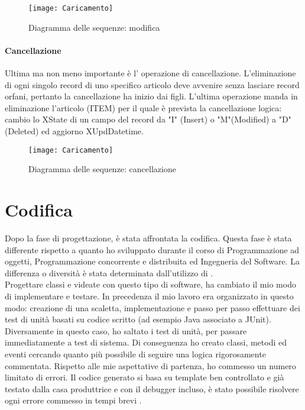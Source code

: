 \begin{figure}[!h] 
	\centering 
	\texttt{[image: Caricamento]} 
	\caption{Diagramma delle sequenze: modifica}
	\label{DS:modifica}
\end{figure}

\paragraph{Cancellazione}
Ultima ma non meno importante è l' operazione di cancellazione. L'eliminazione di ogni singolo record di uno specifico articolo deve avvenire senza lasciare record orfani, pertanto la cancellazione ha inizio dai figli. L'ultima operazione manda in eliminazione l'articolo (ITEM) per il quale è prevista la cancellazione logica: cambio lo XState di un campo del record da "I" (Insert) o "M"(Modified) a "D" (Deleted) ed aggiorno XUpdDatetime.\\

\begin{figure}[!h] 
	\centering 
	\texttt{[image: Caricamento]} 
	\caption{Diagramma delle sequenze: cancellazione}
	\label{DS:cancellazione}
\end{figure}



\section{Codifica}
Dopo la fase di progettazione, è stata affrontata la codifica. Questa fase è stata differente rispetto a quanto ho sviluppato durante il corso di Programmazione ad oggetti, Programmazione concorrente e distribuita ed Ingegneria del Software. La differenza o diversità è stata determinata dall'utilizzo di \inde.\\
Progettare classi e videate con questo tipo di software, ha cambiato il mio modo di implementare e testare. In precedenza il mio lavoro era organizzato in questo modo: creazione di una scaletta, implementazione e passo per passo effettuare dei test di unità basati su codice scritto (ad esempio Java associato a JUnit).\\
Diversamente in questo caso, ho saltato i test di unità, per passare immediatamente a test di sistema. Di conseguenza ho creato classi, metodi ed eventi cercando quanto più possibile di seguire una logica rigorosamente commentata. 
Rispetto alle mie aspettative di partenza, ho commesso un numero limitato di errori. Il codice generato si basa su template ben controllato e già testato dalla casa produttrice e con il debugger incluso, è stato possibile risolvere ogni errore commesso in tempi brevi  .


